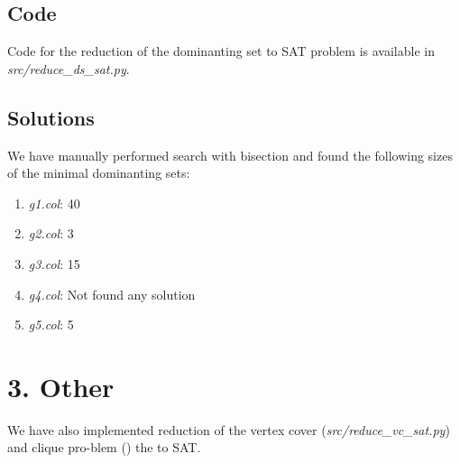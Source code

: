 \documentclass[a4paper,11pt]{article}
\theoremstyle{mytheor}
\begin{document}
\subsection*{Code}

Code for the reduction of the dominanting set to SAT problem is available in \textit{src/reduce\_ds\_sat.py}.

\newpage
\subsection*{Solutions}

We have manually performed search with bisection and found the following sizes of the minimal dominanting sets:

\begin{enumerate}
  \item \textit{g1.col}: 40
  \item \textit{g2.col}: 3
  \item \textit{g3.col}: 15
  \item \textit{g4.col}: Not found any solution
  \item \textit{g5.col}: 5
\end{enumerate}

\section*{3. Other}

We have also implemented reduction of the vertex cover (\textit{src/reduce\_vc\_sat.py}) and clique pro-blem () the to SAT.
\end{document}
